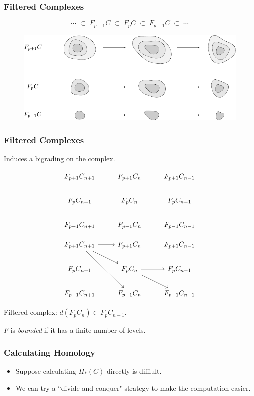 \documentclass{beamer}
\begin{document}
\begin{frame}
	\frametitle{Filtered Complexes}

	\[
		\cdots \;\subset\; F_{p-1}C \;\subset\; F_{p}C \;\subset\; F_{p+1}C \;\subset\; \cdots
	\] 
	\vspace{5mm}
	\begin{figure}[H]
		\centering
		\includegraphics[scale=0.8]{fig/filtered-complex.pdf}
	\end{figure}
\end{frame}

\begin{frame}[fragile]
	\frametitle{Filtered Complexes}

	Induces a bigrading on the complex.
	\begin{overprint}
		\[
		\begin{tikzcd}
			F_{p+1}C_{n+1}&F_{p+1}C_{n}&F_{p+1}C_{n-1}\\
			F_{p}C_{n+1}&F_{p}C_{n}&F_{p}C_{n-1}\\
			F_{p-1}C_{n+1}&F_{p-1}C_{n}&F_{p-1}C_{n-1}
		\end{tikzcd}
		\] 

		\[
		\begin{tikzcd}
			F_{p+1}C_{n+1}\arrow[r]\arrow[dr]\arrow[ddr]&F_{p+1}C_{n}&F_{p+1}C_{n-1}\\
			F_{p}C_{n+1}&F_{p}C_{n}\rar\arrow[dr]&F_{p}C_{n-1}\\
			F_{p-1}C_{n+1}&F_{p-1}C_{n}&F_{p-1}C_{n-1}
		\end{tikzcd}
		\] 
	\end{overprint}
	\vfill

	 Filtered complex: $d(F_{p}C_{n}) \subset F_{p}C_{n-1}$.
	\vspace{5mm}

	 $F$ is \textit{bounded} if it has a finite number of levels.
\end{frame}

\begin{frame}
	\frametitle{Calculating Homology}

	\begin{itemize}
		\item Suppose calculating $H_{*}(C)$ directly is diffiult.
		\item  We can try a ``divide and conquer" strategy to make the computation easier.
	\end{itemize}
\end{frame}
\end{document}
